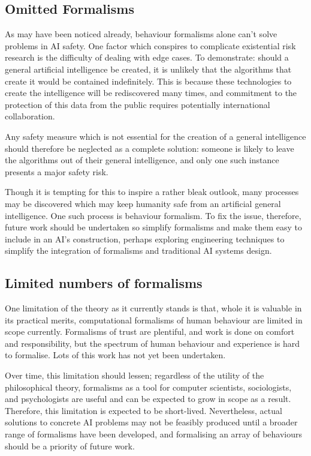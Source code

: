 \subsection{Omitted Formalisms}
As may have been noticed already, behaviour formalisms alone can't solve problems in AI safety. One factor which conspires to complicate existential risk research is the difficulty of dealing with edge cases. To demonstrate: should a general artificial intelligence be created, it is unlikely that the algorithms that create it would be contained indefinitely. This is because these technologies to create the intelligence will be rediscovered many times, and commitment to the protection of this data from the public requires potentially international collaboration.\par

Any safety measure which is not essential for the creation of a general intelligence should therefore be neglected as a complete solution: someone is likely to leave the algorithms out of their general intelligence, and only one such instance presents a major safety risk.\par

Though it is tempting for this to inspire a rather bleak outlook, many processes may be discovered which may keep humanity safe from an artificial general intelligence. One such process is behaviour formalism. To fix the issue, therefore, future work should be undertaken so simplify formalisms and make them easy to include in an AI's construction, perhaps exploring engineering techniques to simplify the integration of formalisms and traditional AI systems design.\par

\subsection{Limited numbers of formalisms}
One limitation of the theory as it currently stands is that, whole it is valuable in its practical merits, computational formalisms of human behaviour are limited in scope currently. Formalisms of trust are plentiful, and work is done on comfort and responsibility, but the spectrum of human behaviour and experience is hard to formalise. Lots of this work has not yet been undertaken. \par

Over time, this limitation should lessen; regardless of the utility of the philosophical theory, formalisms as a tool for computer scientists, sociologists, and psychologists are useful and can be expected to grow in scope as a result. Therefore, this limitation is expected to be short-lived. Nevertheless, actual solutions to concrete AI problems may not be feasibly produced until a broader range of formalisms have been developed, and formalising an array of behaviours should be a priority of future work.\par


